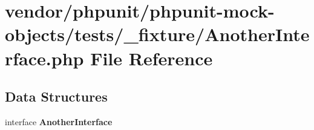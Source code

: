 \section{vendor/phpunit/phpunit-\/mock-\/objects/tests/\+\_\+fixture/\+Another\+Interface.php File Reference}
\label{_another_interface_8php}
\subsection*{Data Structures}
\begin{DoxyCompactItemize}
\item 
interface {\bf Another\+Interface}
\end{DoxyCompactItemize}
